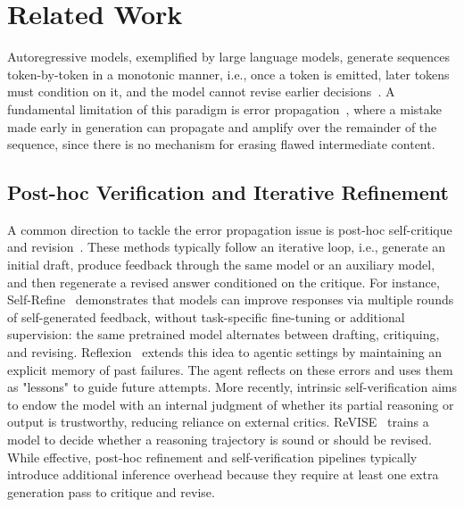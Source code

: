 \section{Related Work}

Autoregressive models, exemplified by large language models, generate sequences token-by-token in a monotonic manner, i.e., once a token is emitted, later tokens must condition on it, and the model cannot revise earlier decisions~\cite {bachmann2024pitfalls, thoppilan2022lamda}.
A fundamental limitation of this paradigm is error propagation~\cite{zhang2023snowball, gan2025rethinking}, where a mistake made early in generation can propagate and amplify over the remainder of the sequence, since there is no mechanism for erasing flawed intermediate content.

\subsection{Post-hoc Verification and Iterative Refinement}
A common direction to tackle the error propagation issue is post-hoc self-critique and revision~\cite{shinn2023reflexion, welleck2022generating, gou2023critic, wang2022self}. These methods typically follow an iterative loop, i.e., generate an initial draft, produce feedback through the same model or an auxiliary model, and then regenerate a revised answer conditioned on the critique.
For instance, Self-Refine~\cite{madaan2023selfrefine} demonstrates that models can improve responses via multiple rounds of self-generated feedback, without task-specific fine-tuning or additional supervision: the same pretrained model alternates between drafting, critiquing, and revising. 
Reflexion~\cite{shinn2023reflexion} extends this idea to agentic settings by maintaining an explicit memory of past failures. 
The agent reflects on these errors and uses them as "lessons" to guide future attempts.
More recently, intrinsic self-verification aims to endow the model with an internal judgment of whether its partial reasoning or output is trustworthy, reducing reliance on external critics. 
ReVISE~\cite{lee2025revise} trains a model to decide whether a reasoning trajectory is sound or should be revised. 
While effective, post-hoc refinement and self-verification pipelines typically introduce additional inference overhead because they require at least one extra generation pass to critique and revise.

